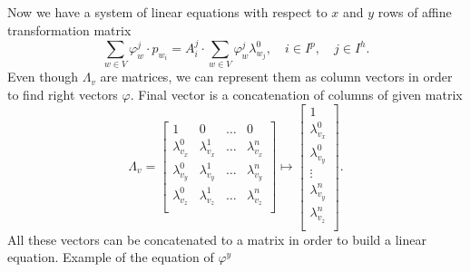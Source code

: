 Now we have a system of linear equations
with respect to $x$ and $y$ rows of affine transformation matrix
\begin{equation*}
  \sum\limits_{w \in V} \varphi_w^j \cdot p_{w_i}
  = A_i^j \cdot \sum\limits_{w \in V} \varphi_w^j \lambda^0_{w_j},
  \quad i \in I^p,
  \quad j \in I^h.
\end{equation*}
Even though $\Lambda_v$ are matrices,
we can represent them as column vectors
in order to find right vectors $\varphi$.
Final vector is a concatenation of columns of given matrix
\begin{equation*}
  \Lambda_v = \begin{bmatrix}
    1               & 0               & \dots & 0 \\
    \lambda^0_{v_x} & \lambda^1_{v_x} & \dots & \lambda^n_{v_x} \\
    \lambda^0_{v_y} & \lambda^1_{v_y} & \dots & \lambda^n_{v_y} \\
    \lambda^0_{v_z} & \lambda^1_{v_z} & \dots & \lambda^n_{v_z} \\
  \end{bmatrix}
  \mapsto
  \begin{bmatrix}
    1 \\
    \lambda^0_{v_x} \\
    \lambda^0_{v_y} \\
    \vdots \\
    \lambda^n_{v_y} \\
    \lambda^n_{v_z} \\
  \end{bmatrix}.
\end{equation*}
All these vectors can be concatenated to a matrix
in order to build a linear equation.
Example of the equation of $\varphi^y$
